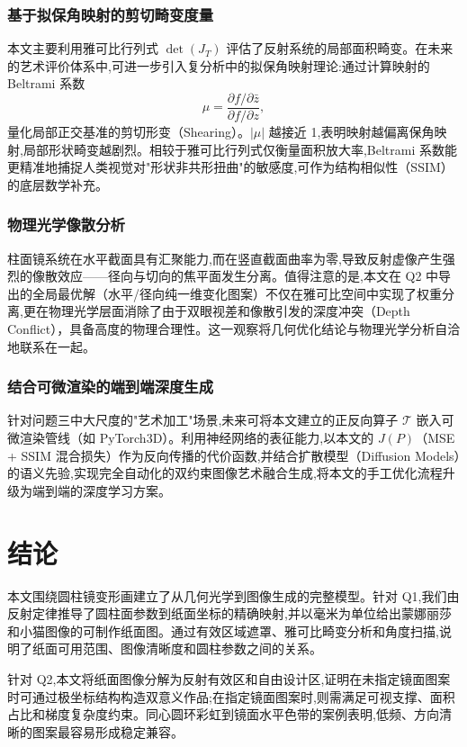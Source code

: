 \documentclass[12pt, a4paper]{ctexart}
\begin{document}
\subsubsection{基于拟保角映射的剪切畸变度量}

本文主要利用雅可比行列式 $\det(J_T)$ 评估了反射系统的局部面积畸变。在未来的艺术评价体系中,可进一步引入复分析中的拟保角映射理论:通过计算映射的 Beltrami 系数
\[
\mu = \frac{\partial f / \partial \bar{z}}{\partial f / \partial z},
\]
量化局部正交基准的剪切形变（Shearing）。$|\mu|$ 越接近 1,表明映射越偏离保角映射,局部形状畸变越剧烈。相较于雅可比行列式仅衡量面积放大率,Beltrami 系数能更精准地捕捉人类视觉对"形状非共形扭曲"的敏感度,可作为结构相似性（SSIM）的底层数学补充。

\subsubsection{物理光学像散分析}

柱面镜系统在水平截面具有汇聚能力,而在竖直截面曲率为零,导致反射虚像产生强烈的像散效应——径向与切向的焦平面发生分离。值得注意的是,本文在 Q2 中导出的全局最优解（水平/径向纯一维变化图案）不仅在雅可比空间中实现了权重分离,更在物理光学层面消除了由于双眼视差和像散引发的深度冲突（Depth Conflict），具备高度的物理合理性。这一观察将几何优化结论与物理光学分析自洽地联系在一起。

\subsubsection{结合可微渲染的端到端深度生成}

针对问题三中大尺度的"艺术加工"场景,未来可将本文建立的正反向算子 $\mathcal{T}$ 嵌入可微渲染管线（如 PyTorch3D）。利用神经网络的表征能力,以本文的 $J(P)$（MSE + SSIM 混合损失）作为反向传播的代价函数,并结合扩散模型（Diffusion Models）的语义先验,实现完全自动化的双约束图像艺术融合生成,将本文的手工优化流程升级为端到端的深度学习方案。

\section{结论}
本文围绕圆柱镜变形画建立了从几何光学到图像生成的完整模型。针对 Q1,我们由反射定律推导了圆柱面参数到纸面坐标的精确映射,并以毫米为单位给出蒙娜丽莎和小猫图像的可制作纸面图。通过有效区域遮罩、雅可比畸变分析和角度扫描,说明了纸面可用范围、图像清晰度和圆柱参数之间的关系。

针对 Q2,本文将纸面图像分解为反射有效区和自由设计区,证明在未指定镜面图案时可通过极坐标结构构造双意义作品;在指定镜面图案时,则需满足可视支撑、面积占比和梯度复杂度约束。同心圆环彩虹到镜面水平色带的案例表明,低频、方向清晰的图案最容易形成稳定兼容。
\end{document}
